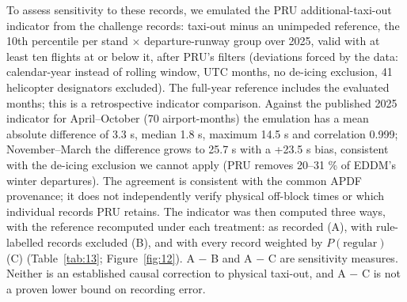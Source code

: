 \documentclass[
  manuscript=article,  %
  layout=preprint,     %
  year=2026,
  volume=4,
]{extra/joas}
\begin{document}
To assess sensitivity to these records, we emulated the PRU additional-taxi-out indicator from the challenge records: taxi-out minus an unimpeded reference, the 10th percentile per stand $\times$ departure-runway group over 2025, valid with at least ten flights at or below it, after PRU's filters (deviations forced by the data: calendar-year instead of rolling window, UTC months, no de-icing exclusion, 41 helicopter designators excluded). The full-year reference includes the evaluated months; this is a retrospective indicator comparison. Against the published 2025 indicator for April--October (70 airport-months) the emulation has a mean absolute difference of 3.3 s, median 1.8 s, maximum 14.5 s and correlation 0.999; November--March the difference grows to 25.7 s with a +23.5 s bias, consistent with the de-icing exclusion we cannot apply (PRU removes 20--31 \% of EDDM's winter departures). The agreement is consistent with the common APDF provenance; it does not independently verify physical off-block times or which individual records PRU retains. The indicator was then computed three ways, with the reference recomputed under each treatment: as recorded (A), with rule-labelled records excluded (B), and with every record weighted by \(P(\text{regular})\) (C) (Table~\ref{tab:13}; Figure~\ref{fig:12}). A $-$ B and A $-$ C are sensitivity measures. Neither is an established causal correction to physical taxi-out, and A $-$ C is not a proven lower bound on recording error.
\end{document}

